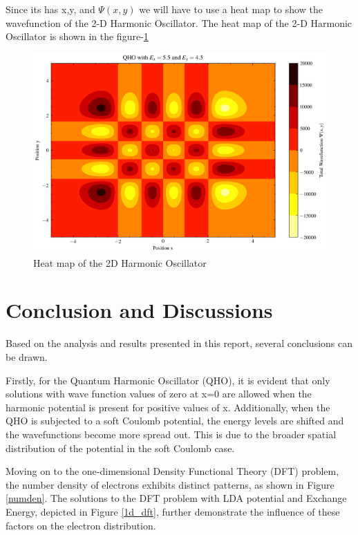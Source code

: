\documentclass{article}
\begin{document}
\begin{multicols}{2}
Since its has x,y, and $\Psi(x,y)$ we will have to use a heat map to show the wavefunction of the 2-D Harmonic Oscillator. The heat map of the 2-D Harmonic Oscillator is shown in the figure-\ref{2d}

\begin{figure}[H]
    \centering
    \includegraphics[width = \columnwidth]{Images/2dqhosoln.png}
    \caption{Heat map of the 2D Harmonic Oscillator}
    \label{2d}
\end{figure}



\section{\label{Conclusion}Conclusion and Discussions}

Based on the analysis and results presented in this report, several conclusions can be drawn.

Firstly, for the Quantum Harmonic Oscillator (QHO), it is evident that only solutions with wave function values of zero at x=0 are allowed when the harmonic potential is present for positive values of x. Additionally, when the QHO is subjected to a soft Coulomb potential, the energy levels are shifted and the wavefunctions become more spread out. This is due to the broader spatial distribution of the potential in the soft Coulomb case.

Moving on to the one-dimensional Density Functional Theory (DFT) problem, the number density of electrons exhibits distinct patterns, as shown in Figure \ref{numden}. The solutions to the DFT problem with LDA potential and Exchange Energy, depicted in Figure \ref{1d_dft}, further demonstrate the influence of these factors on the electron distribution.


\end{multicols}
\end{document}
